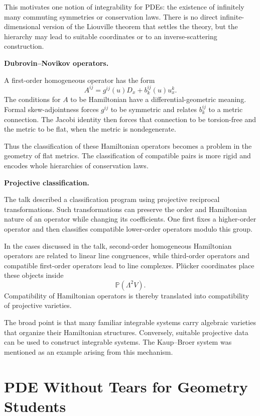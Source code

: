 This motivates one notion of integrability
for PDEs: the existence of infinitely many
commuting symmetries or conservation laws.
There is no direct infinite-dimensional
version of the Liouville theorem that
settles the theory, but the hierarchy may
lead to suitable coordinates or to an
inverse-scattering construction.

\medskip\noindent
{\bf Dubrovin--Novikov operators.}

A first-order homogeneous operator has the
form
$$
A^{ij}=g^{ij}(u)D_x
+b^{ij}_k(u)u_x^k.
$$
The conditions for $A$ to be Hamiltonian
have a differential-geometric meaning.
Formal skew-adjointness forces $g^{ij}$ to
be symmetric and relates $b^{ij}_k$ to a
metric connection. The Jacobi identity
then forces that connection to be
torsion-free and the metric to be flat,
when the metric is nondegenerate.

Thus the classification of these
Hamiltonian operators becomes a problem
in the geometry of flat metrics. The
classification of compatible pairs is
more rigid and encodes whole hierarchies
of conservation laws.

\medskip\noindent
{\bf Projective classification.}

The talk described a classification program
using projective reciprocal
transformations. Such transformations can
preserve the order and Hamiltonian nature
of an operator while changing its
coefficients. One first fixes a
higher-order operator and then classifies
compatible lower-order operators modulo
this group.

In the cases discussed in the talk,
second-order homogeneous Hamiltonian
operators are related to linear line
congruences, while third-order operators
and compatible first-order operators lead
to line complexes. Pl\"ucker coordinates
place these objects inside
$$
\mathbb{P}(\Lambda^2V).
$$
Compatibility of Hamiltonian operators is
thereby translated into compatibility of
projective varieties.

The broad point is that many familiar
integrable systems carry algebraic
varieties that organize their Hamiltonian
structures. Conversely, suitable
projective data can be used to construct
integrable systems. The Kaup--Broer system
was mentioned as an example arising from
this mechanism.

\section{PDE Without Tears for Geometry
Students}
\label{section-pde-without-tears}

